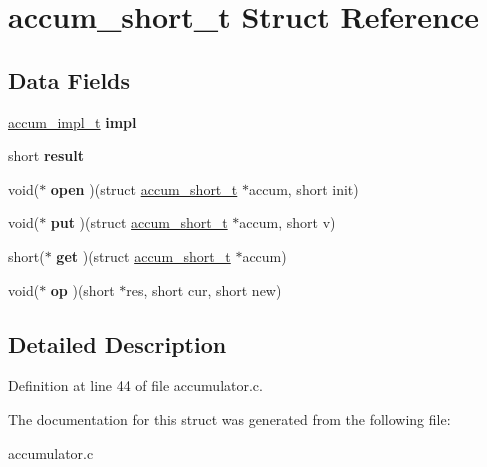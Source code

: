 \hypertarget{structaccum__short__t}{\section{accum\-\_\-short\-\_\-t Struct Reference}
\label{structaccum__short__t}
}
\subsection*{Data Fields}
\begin{DoxyCompactItemize}
\item 
\hypertarget{structaccum__short__t_a18435b9a5280c619373ac93f16b434c7}{\hyperlink{structaccum__impl__t}{accum\-\_\-impl\-\_\-t} {\bfseries impl}}\label{structaccum__short__t_a18435b9a5280c619373ac93f16b434c7}

\item 
\hypertarget{structaccum__short__t_a88db4d630cba0949e88ac9616ad8d48c}{short {\bfseries result}}\label{structaccum__short__t_a88db4d630cba0949e88ac9616ad8d48c}

\item 
\hypertarget{structaccum__short__t_ae1595b5af3be8e53a9f2cf73370d197a}{void($\ast$ {\bfseries open} )(struct \hyperlink{structaccum__short__t}{accum\-\_\-short\-\_\-t} $\ast$accum, short init)}\label{structaccum__short__t_ae1595b5af3be8e53a9f2cf73370d197a}

\item 
\hypertarget{structaccum__short__t_a805efb380d6749d4810dc932a50d7b15}{void($\ast$ {\bfseries put} )(struct \hyperlink{structaccum__short__t}{accum\-\_\-short\-\_\-t} $\ast$accum, short v)}\label{structaccum__short__t_a805efb380d6749d4810dc932a50d7b15}

\item 
\hypertarget{structaccum__short__t_a3c92881f045cd7f809e2b4a91872222f}{short($\ast$ {\bfseries get} )(struct \hyperlink{structaccum__short__t}{accum\-\_\-short\-\_\-t} $\ast$accum)}\label{structaccum__short__t_a3c92881f045cd7f809e2b4a91872222f}

\item 
\hypertarget{structaccum__short__t_a4fc379f3bdbfac84bed6775c9f235011}{void($\ast$ {\bfseries op} )(short $\ast$res, short cur, short new)}\label{structaccum__short__t_a4fc379f3bdbfac84bed6775c9f235011}

\end{DoxyCompactItemize}


\subsection{Detailed Description}


Definition at line 44 of file accumulator.\-c.



The documentation for this struct was generated from the following file\-:\begin{DoxyCompactItemize}
\item 
accumulator.\-c\end{DoxyCompactItemize}
